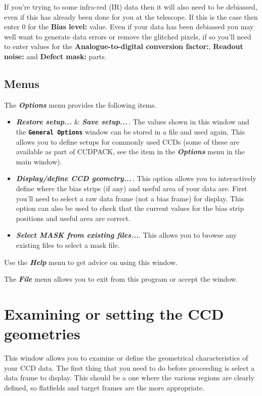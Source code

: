 \documentclass[11pt,nolof]{starlink}
\providecommand{\butt}[1]{{\bf \tt #1}}
\providecommand{\menu}[1]{{\bf \em #1}}
\providecommand{\wlab}[1]{{\bf #1}}
\begin{document}
If you're trying to  some infra-red
(IR) data then it will also need to be debiassed, even if this has
already been done for you at the telescope. If this is the case then
enter 0 for the \wlab{Bias level:} value. Even if your data has been
debiassed you may well want to generate data errors or remove the
glitched pixels, if so you'll need to enter values for the
\wlab{Analogue-to-digital conversion factor:},
\wlab{Readout noise:} and \wlab{Defect mask:} parts.


\subsection{Menus }

The \menu{Options} menu provides the following items.

\begin{itemize}
\item \menu{Restore setup...} \& \menu{Save setup...}\,. The values
shown in this window and the \butt{General Options} window can be
stored in a file and used again. This allows you to define setups for
commonly used CCDs (some of these are available as part of CCDPACK,
see the
\htmlref{\menu{Set detector...}}{CCDSetDetectorWindow}
item in the \menu{Options} menu in the main window).

\item \menu{Display/define CCD geometry...}\,. \label{definegeometry}
This option allows you to interactively define where the bias strips
(if any) and useful area of your data are. First you'll need to select
a raw data frame (not a bias frame) for display.  This option can also
be used to check that the current values for the bias strip positions
and useful area are correct.

\item \menu{Select MASK from existing files...}. This allows you to
browse any existing files to select a mask file.
\end{itemize}

Use the \menu{Help} menu to get advice on using this window.

The \menu{File} menu allows you to exit from this program or
accept the window.

\section{Examining or setting the CCD geometries }
This window allows you to examine or define the geometrical
characteristics of your CCD data. The first thing that you need to do
before proceeding is select a data frame to display. This should be a
one where the various regions are clearly defined, so flatfields and
target frames are the more appropriate.
\end{document}
